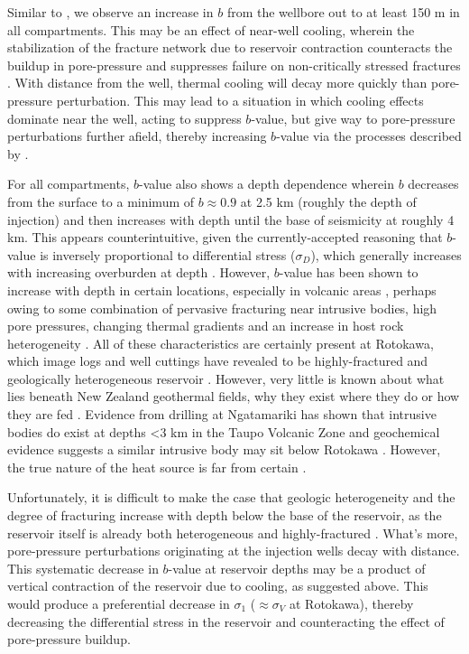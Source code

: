 Similar to \citet{Bachmann_2012}, we observe an increase in $b$ from the wellbore out to at least 150 m in all compartments. This may be an effect of near-well cooling, wherein the stabilization of the fracture network due to reservoir contraction counteracts the buildup in pore-pressure and suppresses failure on non-critically stressed fractures \citep{Jeanne_2015tensor}. With distance from the well, thermal cooling will decay more quickly than pore-pressure perturbation. This may lead to a situation in which cooling effects dominate near the well, acting to suppress $b$-value, but give way to pore-pressure perturbations further afield, thereby increasing $b$-value via the processes described by \citet{Bachmann_2012}.

For all compartments, $b$-value also shows a depth dependence wherein $b$ decreases from the surface to a minimum of $b\approx0.9$ at 2.5 km (roughly the depth of injection) and then increases with depth until the base of seismicity at roughly 4 km. This appears counterintuitive, given the currently-accepted reasoning that $b$-value is inversely proportional to differential stress ($\sigma_D$), which generally increases with increasing overburden at depth \citep{Schorlemmer_2005}. However, $b$-value has been shown to increase with depth in certain locations, especially in volcanic areas \citep[e.g.][]{Wiemer_1998}, perhaps owing to some combination of pervasive fracturing near intrusive bodies, high pore pressures, changing thermal gradients and an increase in host rock heterogeneity \citep{Schorlemmer_2005,Wiemer_1998,Warren_1970}. All of these characteristics are certainly present at Rotokawa, which image logs and well cuttings have revealed to be highly-fractured and geologically heterogeneous reservoir \cite{Massiot_2017,McNamara_2016}. However, very little is known about what lies beneath New Zealand geothermal fields, why they exist where they do or how they are fed \citep{Wilson_2016}. Evidence from drilling at Ngatamariki has shown that intrusive bodies do exist at depths \textless{3} km in the Taupo Volcanic Zone \citep{Chambefort_2016} and geochemical evidence suggests a similar intrusive body may sit below Rotokawa \citep{winick2009}. However, the true nature of the heat source is far from certain \citep{Wilson_2016}.

Unfortunately, it is difficult to make the case that geologic heterogeneity and the degree of fracturing increase with depth below the base of the reservoir, as the reservoir itself is already both heterogeneous and highly-fractured \citep{Massiot_2017,McNamara_2016}. What's more, pore-pressure perturbations originating at the injection wells decay with distance. This systematic decrease in $b$-value at reservoir depths may be a product of vertical contraction of the reservoir due to cooling, as suggested above. This would produce a preferential decrease in $\sigma_{1}$ ($\approx{\sigma_{V}}$ at Rotokawa), thereby decreasing the differential stress in the reservoir and counteracting the effect of pore-pressure buildup.

